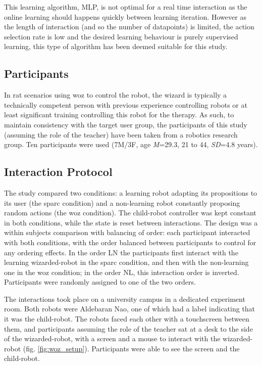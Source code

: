 This learning algorithm, MLP, is not optimal for a real time interaction as the online learning should happens quickly between learning iteration. However as the length of interaction (and so the number of datapoints) is limited, the action selection rate is low and the desired learning behaviour is purely supervised learning, this type of algorithm has been deemed suitable for this study.

\subsection{Participants}

In \gls{rat} scenarios using \gls{woz} to control the robot, the wizard is typically a technically competent person with previous experience controlling robots or at least significant training controlling this robot for the therapy. As such, to maintain consistency with the target user group, the participants of this study (assuming the role of the teacher) have been taken from a robotics research group. Ten participants were used (7M/3F, age \textit{M}=29.3, 21 to 44, \textit{SD}=4.8 years).

\subsection{Interaction Protocol}

The study compared two conditions: a learning robot adapting its propositions to its user (the \gls{sparc} condition) and a non-learning robot constantly proposing random actions (the \gls{woz} condition). The child-robot controller was kept constant in both conditions, while the state is reset between interactions. The design was a within subjects comparison with balancing of order: each participant interacted with both conditions, with the order balanced between participants to control for any ordering effects. In the order LN the participants first interact with the learning wizarded-robot in the \gls{sparc} condition, and then with the non-learning one in the \gls{woz} condition; in the order NL, this interaction order is inverted. Participants were randomly assigned to one of the two orders.

The interactions took place on a university campus in a dedicated experiment room. Both robots were Aldebaran Nao, one of which had a label indicating that it was the child-robot. The robots faced each other with a touchscreen between them, and participants assuming the role of the teacher sat at a desk to the side of the wizarded-robot, with a screen and a mouse to interact with the wizarded-robot (fig. \ref{fig:woz_setup}). Participants were able to see the screen and the child-robot.

